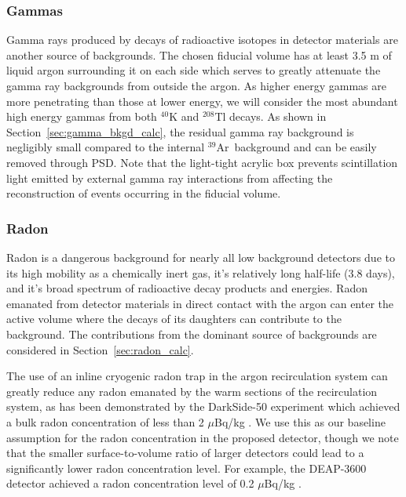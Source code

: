 \documentclass[a4paper,11pt]{article}
\newcommand{\artn}{$^{39}$Ar}
\begin{document}
\subsubsection{Gammas}
Gamma rays produced by decays of radioactive isotopes in detector materials are another source of backgrounds. The chosen fiducial volume has at least 3.5 m of liquid argon surrounding it on each side which serves to greatly attenuate the gamma ray backgrounds from outside the argon. As higher energy gammas are more penetrating than those at lower energy, we will consider the most abundant high energy gammas from both $^{40}$K and $^{208}$Tl decays.  As shown in Section~\ref{sec:gamma_bkgd_calc}, the residual gamma ray background is negligibly small compared to the internal \artn~background and can be easily removed through PSD. Note that the light-tight acrylic box prevents scintillation light emitted by external gamma ray interactions from affecting the reconstruction of events occurring in the fiducial volume. 


\subsubsection{Radon}
Radon is a dangerous background for nearly all low background detectors due to its high mobility as a chemically inert gas, it's relatively long half-life (3.8 days), and it's broad spectrum of radioactive decay products and energies. Radon emanated from detector materials in direct contact with the argon can enter the active volume where the decays of its daughters can contribute to the background. The contributions from the dominant source of backgrounds are considered in Section~\ref{sec:radon_calc}. 

The use of an inline cryogenic radon trap in the argon recirculation system can greatly reduce any radon emanated by the warm sections of the recirculation system, as has been demonstrated by the DarkSide-50 experiment \cite{agnes2015first} which achieved a bulk radon concentration of less than 2 $\mu$Bq/kg \cite{darkside20k}. We use this as our baseline assumption for the radon concentration in the proposed detector, though we note that the smaller surface-to-volume ratio of larger detectors could lead to a significantly lower radon concentration level. For example, the DEAP-3600 detector achieved a radon concentration level of 0.2 $\mu$Bq/kg \cite{amaudruz2018first}.

\end{document}
